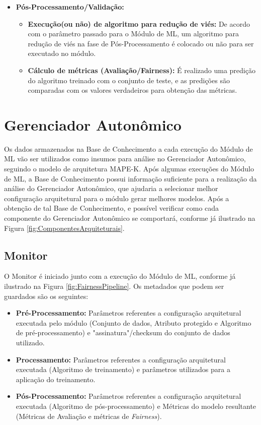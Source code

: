 \documentclass[portugues]{ic-tese}
\begin{document}
\begin{itemize}
\begin{itemize}
	\end{itemize}
\item \textbf{Pós-Processamento/Validação:}
	\begin{itemize}
	\item \textbf{Execução(ou não) de algoritmo para redução de viés:} De acordo com o parâmetro passado para o Módulo de ML, um algoritmo para redução de viés na fase de Pós-Processamento é colocado ou não para ser executado no módulo.
	\item \textbf{Cálculo de métricas (Avaliação/Fairness):} É realizado uma predição do algoritmo treinado com o conjunto de teste, e as predições são comparadas com os valores verdadeiros para obtenção das métricas.
	\end{itemize}
\end{itemize}

\section{Gerenciador Autonômico}
\label{sec:GerenciadorAutonomico}

Os dados armazenados na Base de Conhecimento a cada execução do Módulo de ML vão ser utilizados como insumos para análise no Gerenciador Autonômico, seguindo o modelo de arquitetura MAPE-K. Após algumas execuções do Módulo de ML, a Base de Conhecimento possui informação suficiente para a realização da análise do Gerenciador Autonômico, que ajudaria a selecionar melhor configuração arquitetural para o módulo gerar melhores modelos. Após a obtenção de tal Base de Conhecimento, e possível verificar como cada componente do Gerenciador Autonômico se comportará, conforme já ilustrado na Figura \ref{fig:ComponentesArquiteturais}.

\subsection{Monitor}

O Monitor é iniciado junto com a execução do Módulo de ML, conforme já ilustrado na Figura \ref{fig:FairnessPipeline}. Os metadados que podem ser guardados são os seguintes:

\begin{itemize}
\item \textbf{Pré-Processamento:} Parâmetros referentes a configuração arquitetural executada pelo módulo (Conjunto de dados, Atributo protegido e Algoritmo de pré-processamento) e "assinatura"/checksum do conjunto de dados utilizado.
\item \textbf{Processamento:} Parâmetros referentes a configuração arquitetural executada (Algoritmo de treinamento) e parâmetros utilizados para a aplicação do treinamento.
\item \textbf{Pós-Processamento:} Parâmetros referentes a configuração arquitetural executada (Algoritmo de pós-processamento) e Métricas do modelo resultante (Métricas de Avaliação e métricas de \textit{Fairness}).
\end{itemize}
\end{document}
